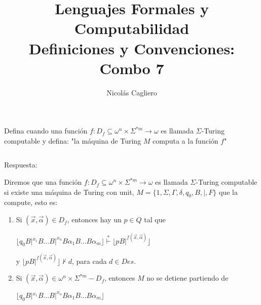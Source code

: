 \documentclass{article}
\title{Lenguajes Formales y Computabilidad \\
        \large Definiciones y Convenciones: Combo 7 }
\author{Nicolás Cagliero}
\begin{document}
\maketitle

Defina cuando una función $f : D_f \subseteq \omega^n \times \Sigma^{*m} 
\rightarrow \omega$
es llamada $\Sigma$-Turing computable y defina: "la máquina de Turing $M$
computa a la función $f$"

\(\)
\begin{center}
    Respuesta: 
    \(\)
\end{center}

Diremos que una función $f : D_f \subseteq \omega^n \times 
\Sigma^{*m} \rightarrow \omega$
es llamada $\Sigma$-Turing computable si existe una máquina de 
Turing con unit, $M = \{1, \Sigma, \Gamma, \delta, q_0, B, |, F\}$
que la compute, esto es:

\begin{enumerate}
        \item Si $
        (\overset{\rightarrow}{x}, \overset{\rightarrow}{\alpha})
        \in D_f$, entonces hay un $p \in Q$ tal que 
        \begin{center}
                $\lfloor q_0 B |^{x_1} B \dots B |^{x_n} B \alpha_1
                B \dots B \alpha_m \rfloor \overset{*}{\vdash} 
                \lfloor p B |^{f(\overset{\rightarrow}{x}, \overset{\rightarrow}{\alpha})}
                \rfloor$
        \end{center}
        y $\lfloor p B |^{f(\overset{\rightarrow}{x}, \overset{\rightarrow}{\alpha})}
        \rfloor \nvdash d$, para cada $d \in Des$.
        \item Si $
        (\overset{\rightarrow}{x}, \overset{\rightarrow}{\alpha})
        \in \omega^n \times \Sigma^{*m} - D_f$, entonces $M$ no se detiene
        partiendo de 
        \begin{center}
                $\lfloor q_0 B |^{x_1} B \dots B |^{x_n} B 
                \alpha_1 B \dots B \alpha_m \rfloor$
        \end{center}
\end{enumerate}
\end{document}
